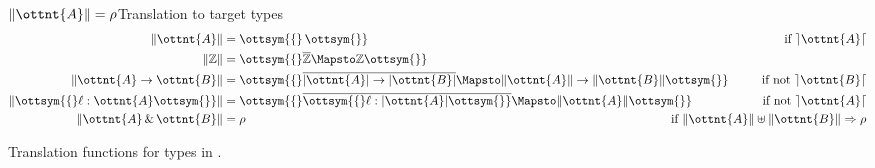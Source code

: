\begin{figure}
\begin{minipage}{0.5\textwidth}
  \begin{rulesection}{$\|  \ottnt{A}  \| = \rho$}{Translation to target types}
  \begin{align*}
    \|  \ottnt{A}  \| &= \ottsym{\{}  \,  \ottsym{\}} &\text{if $ \rceil \ottnt{A} \lceil $} \\ %
    \|   \mathbb{Z}   \| &= \ottsym{\{}   \overline{\mathbb{Z} }   \Mapsto   \mathbb{Z}   \ottsym{\}} &\\
    \|  \ottnt{A}  \rightarrow  \ottnt{B}  \| &= \ottsym{\{}   \overline{  | \ottnt{A} |  \rightarrow  | \ottnt{B} |  }   \Mapsto  \|  \ottnt{A}  \|  \rightarrow  \|  \ottnt{B}  \|  \ottsym{\}} &\text{if not $ \rceil \ottnt{B} \lceil $}\\%
    \|  \ottsym{\{}  \ell  :  \ottnt{A}  \ottsym{\}}  \| &= \ottsym{\{}   \overline{  \ottsym{\{}   \ell   :    | \ottnt{A} |    \ottsym{\}}  }   \Mapsto  \|  \ottnt{A}  \|  \ottsym{\}} &\text{if not $ \rceil \ottnt{A} \lceil $}\\ %
    \|  \ottnt{A}  \, {\&} \,  \ottnt{B}  \| &= \rho  & \hspace*{-2cm} \text{if $ \|  \ottnt{A}  \| \uplus \|  \ottnt{B}  \| \Rightarrow \rho $} %
  \end{align*}
  \end{rulesection}
  \end{minipage}
  \caption{Translation functions for types in \lambdaiplus.}\label{fig:translation}
\end{figure}

